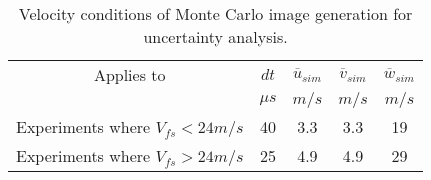 \begin{table}[H]
\begin{center}
\begin{tabular}{|ccccc|}
	\hline
	Applies to & $dt$ & $\overline{u}_{sim}$ & $\overline{v}_{sim}$ & $\overline{w}_{sim}$\\
	  & $\mu s$ & $m/s$ & $m/s$ & $m/s$\\
	\hline
	Experiments where $V_{fs} < 24 m/s$ & 40 & 3.3 & 3.3 & 19\\
	Experiments where $V_{fs} > 24 m/s$ & 25 & 4.9 & 4.9 & 29\\
	\hline
\end{tabular}
\caption{Velocity conditions of Monte Carlo image generation for uncertainty analysis.}
\label{table:uncertainty_sim_table}
\end{center}
\end{table}
